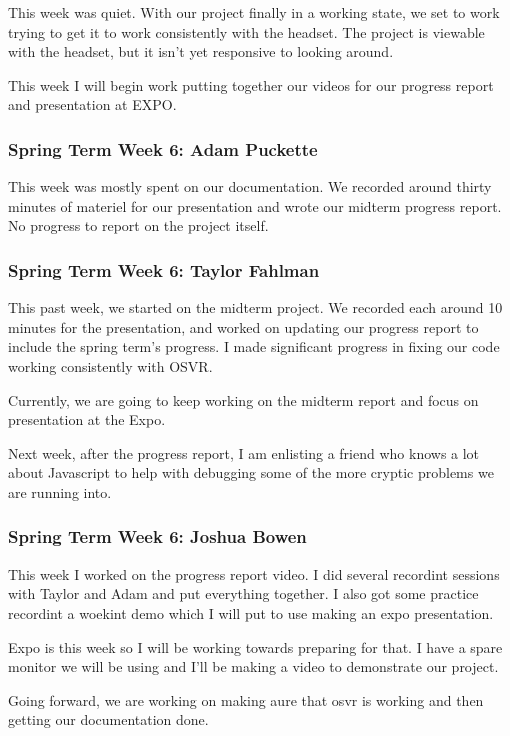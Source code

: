 \documentclass[draftclsnofoot,onecolumn]{IEEEtran}
\begin{document}
This week was quiet. With our project finally in a working state, we set to work trying to get it to work consistently with the headset. The project is viewable with the headset, but it isn't yet responsive to looking around.

This week I will begin work putting together our videos for our progress report and presentation at EXPO.

\subsubsection{Spring Term Week 6: Adam Puckette}

This week was mostly spent on our documentation. We recorded around thirty minutes of materiel for our presentation and wrote our midterm progress report. No progress to report on the project itself.

\subsubsection{Spring Term Week 6: Taylor Fahlman}

This past week, we started on the midterm project. We recorded each around 10 minutes for the presentation, and worked on updating our progress report to include the spring term's progress. I made significant progress in fixing our code working consistently with OSVR.

Currently, we are going to keep working on the midterm report and focus on presentation at the Expo.

Next week, after the progress report, I am enlisting a friend who knows a lot about Javascript to help with debugging some of the more cryptic problems we are running into.

\subsubsection{Spring Term Week 6: Joshua Bowen}

This week I worked on the progress report video. I did several recordint sessions with Taylor and Adam and put everything together. I also got some practice recordint a woekint demo which I will put to use making an expo presentation.

Expo is this week so I will be working towards preparing for that. I have a spare monitor we will be using and I'll be making a video to demonstrate our project.

Going forward, we are working on making aure that osvr is working and then getting our documentation done.
\end{document}
